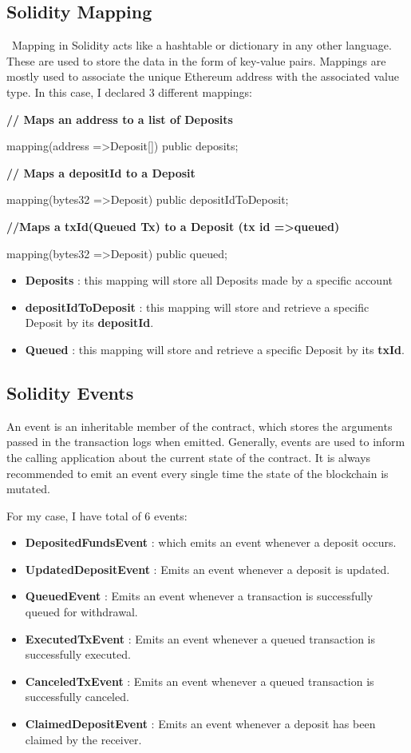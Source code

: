 \documentclass[10pt,twocolumn]{article}
\begin{document}
\subsection{Solidity Mapping}\
Mapping in Solidity acts like a hashtable or dictionary in any other language. These are used to store the data in the form of key-value pairs. Mappings are mostly used to associate the unique Ethereum address with the associated value type.
In this case, I  declared 3 different mappings:

    \item \textbf{// Maps an address to a list of Deposits} 

mapping(address =\textgreater Deposit[]) public deposits;
    
    \item \textbf{// Maps a depositId to a Deposit}

mapping(bytes32 =\textgreater Deposit) public depositIdToDeposit;
 
    \item \textbf{//Maps a txId(Queued Tx) to a Deposit (tx id =\textgreater queued)}

mapping(bytes32 =\textgreater Deposit) public queued;

\begin{itemize}
    \item \textbf{Deposits} : this mapping will store all Deposits made by a specific account
    \item \textbf{depositIdToDeposit} : this mapping will store and retrieve a specific Deposit by its \textbf{depositId}.
    \item \textbf{Queued} : this mapping will store and retrieve a specific Deposit by its \textbf{txId}.
\end{itemize}
\subsection{Solidity Events}
An event is an inheritable member of the contract, which stores the arguments passed in the transaction logs when emitted. Generally, events are used to inform the calling application about the current state of the contract. It is always recommended to emit an event every single time the state of the blockchain is mutated.

For my case, I have total of 6 events:
\begin{itemize}
    \item \textbf{DepositedFundsEvent} : which emits an event whenever a deposit occurs.
    \item \textbf{UpdatedDepositEvent} : Emits an event whenever a deposit is updated.
    \item \textbf{QueuedEvent} : Emits an event whenever a transaction is successfully queued for withdrawal.
    \item \textbf{ExecutedTxEvent} : Emits an event whenever a queued transaction is successfully executed.
    \item \textbf{CanceledTxEvent} : Emits an event whenever a queued transaction is successfully canceled.
    \item \textbf{ClaimedDepositEvent} : Emits an event whenever a deposit has been claimed by the receiver.
\end{itemize}
\end{document}

